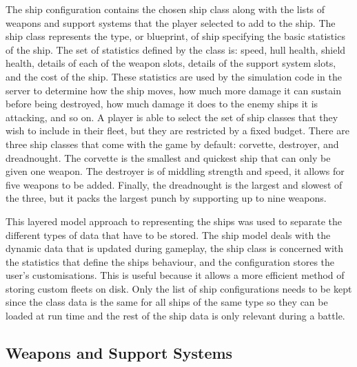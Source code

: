 The ship configuration contains the chosen ship class along with the lists of weapons and support systems that the player selected to add to the ship. The ship class represents the type, or blueprint, of ship specifying the basic statistics of the ship. The set of statistics defined by the class is: speed, hull health, shield health, details of each of the weapon slots, details of the support system slots, and the cost of the ship. These statistics are used by the simulation code in the server to determine how the ship moves, how much more damage it can sustain before being destroyed, how much damage it does to the enemy ships it is attacking, and so on. A player is able to select the set of ship classes that they wish to include in their fleet, but they are restricted by a fixed budget. There are three ship classes that come with the game by default: corvette, destroyer, and dreadnought. The corvette is the smallest and quickest ship that can only be given one weapon. The destroyer is of middling strength and speed, it allows for five weapons to be added. Finally, the dreadnought is the largest and slowest of the three, but it packs the largest punch by supporting up to nine weapons.

This layered model approach to representing the ships was used to separate the different types of data that have to be stored. The ship model deals with the dynamic data that is updated during gameplay, the ship class is concerned with the statistics that define the ships behaviour, and the configuration stores the user's customisations. This is useful because it allows a more efficient method of storing custom fleets on disk. Only the list of ship configurations needs to be kept since the class data is the same for all ships of the same type so they can be loaded at run time and the rest of the ship data is only relevant during a battle.


\subsection{Weapons and Support Systems}


